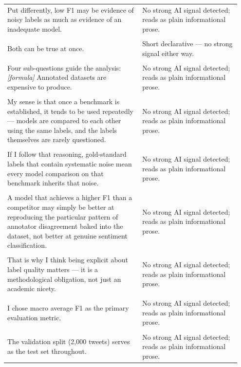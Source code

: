 \documentclass[11pt]{article}
\begin{document}
\begin{longtable}{|p{0.55\linewidth}|p{0.40\linewidth}|}
\hline
\rule{0pt}{3.5cm} & \\
\hline
Put differently, low F1 may be evidence of noisy labels as much as evidence of an inadequate model. & No strong AI signal detected; reads as plain informational prose. \\[2pt]
\hline
\rule{0pt}{3.5cm} & \\
\hline
Both can be true at once. & Short declarative --- no strong signal either way. \\[2pt]
\hline
\rule{0pt}{3.5cm} & \\
\hline
Four sub-questions guide the analysis: \textit{[formula]} Annotated datasets are expensive to produce. & No strong AI signal detected; reads as plain informational prose. \\[2pt]
\hline
\rule{0pt}{3.5cm} & \\
\hline
My sense is that once a benchmark is established, it tends to be used repeatedly --- models are compared to each other using the same labels, and the labels themselves are rarely questioned. & No strong AI signal detected; reads as plain informational prose. \\[2pt]
\hline
\rule{0pt}{3.5cm} & \\
\hline
If I follow that reasoning, gold-standard labels that contain systematic noise mean every model comparison on that benchmark inherits that noise. & No strong AI signal detected; reads as plain informational prose. \\[2pt]
\hline
\rule{0pt}{3.5cm} & \\
\hline
A model that achieves a higher F1 than a competitor may simply be better at reproducing the particular pattern of annotator disagreement baked into the dataset, not better at genuine sentiment classification. & No strong AI signal detected; reads as plain informational prose. \\[2pt]
\hline
\rule{0pt}{3.5cm} & \\
\hline
That is why I think being explicit about label quality matters --- it is a methodological obligation, not just an academic nicety. & No strong AI signal detected; reads as plain informational prose. \\[2pt]
\hline
\rule{0pt}{3.5cm} & \\
\hline
I chose macro average F1 as the primary evaluation metric. & No strong AI signal detected; reads as plain informational prose. \\[2pt]
\hline
\rule{0pt}{3.5cm} & \\
\hline
The validation split (2,000 tweets) serves as the test set throughout. & No strong AI signal detected; reads as plain informational prose. \\[2pt]

\end{longtable}
\end{document}
